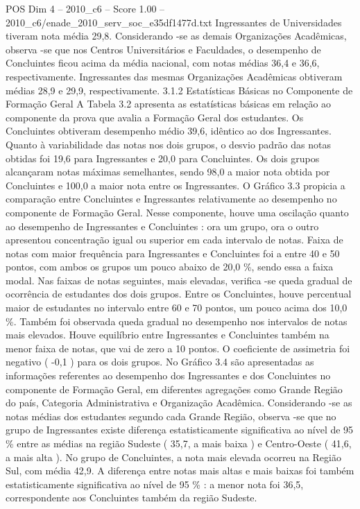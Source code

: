 \begin{textsample}{POS Dim 4 – 2010\_c6 – Score 1.00 – 2010\_c6/enade\_2010\_serv\_soc\_e35df1477d.txt}
Ingressantes de Universidades tiveram nota média 29,8.
Considerando -se as demais Organizações Acadêmicas, observa -se que nos Centros Universitários e Faculdades, o desempenho de Concluintes ficou acima da média nacional, com notas médias 36,4 e 36,6, respectivamente.
Ingressantes das mesmas Organizações Acadêmicas obtiveram médias 28,9 e 29,9, respectivamente. 3.1.2 Estatísticas Básicas no Componente de Formação Geral A Tabela 3.2 apresenta as estatísticas básicas em relação ao componente da prova que avalia a Formação Geral dos estudantes.
Os Concluintes obtiveram desempenho médio 39,6, idêntico ao dos Ingressantes.
Quanto à variabilidade das notas nos dois grupos, o desvio padrão das notas obtidas foi 19,6 para Ingressantes e 20,0 para Concluintes.
Os dois grupos alcançaram notas máximas semelhantes, sendo 98,0 a maior nota obtida por Concluintes e 100,0 a maior nota entre os Ingressantes.
O Gráfico 3.3 propicia a comparação entre Concluintes e Ingressantes relativamente ao desempenho no componente de Formação Geral.
Nesse componente, houve uma oscilação quanto ao desempenho de Ingressantes e Concluintes : ora um grupo, ora o outro apresentou concentração igual ou superior em cada intervalo de notas.
Faixa de notas com maior frequência para Ingressantes e Concluintes foi a entre 40 e 50 pontos, com ambos os grupos um pouco abaixo de 20,0 \%, sendo essa a faixa modal.
Nas faixas de notas seguintes, mais elevadas, verifica -se queda gradual de ocorrência de estudantes dos dois grupos.
Entre os Concluintes, houve percentual maior de estudantes no intervalo entre 60 e 70 pontos, um pouco acima dos 10,0 \%.
Também foi observada queda gradual no desempenho nos intervalos de notas mais elevados.
Houve equilíbrio entre Ingressantes e Concluintes também na menor faixa de notas, que vai de zero a 10 pontos.
O coeficiente de assimetria foi negativo ( -0,1 ) para os dois grupos.
No Gráfico 3.4 são apresentadas as informações referentes ao desempenho dos Ingressantes e dos Concluintes no componente de Formação Geral, em diferentes agregações como Grande Região do país, Categoria Administrativa e Organização Acadêmica.
Considerando -se as notas médias dos estudantes segundo cada Grande Região, observa -se que no grupo de Ingressantes existe diferença estatisticamente significativa ao nível de 95 \% entre as médias na região Sudeste ( 35,7, a mais baixa ) e Centro-Oeste ( 41,6, a mais alta ).
No grupo de Concluintes, a nota mais elevada ocorreu na Região Sul, com média 42,9.
A diferença entre notas mais altas e mais baixas foi também estatisticamente significativa ao nível de 95 \% : a menor nota foi 36,5, correspondente aos Concluintes também da região Sudeste.

\end{textsample}
